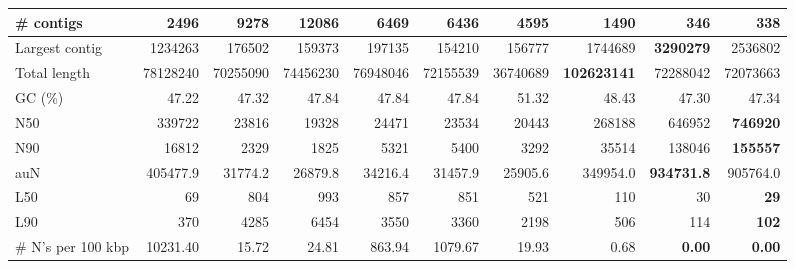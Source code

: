 \documentclass[12pt,a4paper]{article}
\begin{document}
\begin{table}[ht]
\begin{center}
\begin{tabular}{|l*{9}{|r}|}
\# contigs & 2496 & 9278 & 12086 & 6469 & 6436 & 4595 & 1490 & 346 & 338 \\ \hline
Largest contig & 1234263 & 176502 & 159373 & 197135 & 154210 & 156777 & 1744689 & {\bf 3290279} & 2536802 \\ \hline
Total length & 78128240 & 70255090 & 74456230 & 76948046 & 72155539 & 36740689 & {\bf 102623141} & 72288042 & 72073663 \\ \hline
GC (\%) & 47.22 & 47.32 & 47.84 & 47.84 & 47.84 & 51.32 & 48.43 & 47.30 & 47.34 \\ \hline
N50 & 339722 & 23816 & 19328 & 24471 & 23534 & 20443 & 268188 & 646952 & {\bf 746920} \\ \hline
N90 & 16812 & 2329 & 1825 & 5321 & 5400 & 3292 & 35514 & 138046 & {\bf 155557} \\ \hline
auN & 405477.9 & 31774.2 & 26879.8 & 34216.4 & 31457.9 & 25905.6 & 349954.0 & {\bf 934731.8} & 905764.0 \\ \hline
L50 & 69 & 804 & 993 & 857 & 851 & 521 & 110 & 30 & {\bf 29} \\ \hline
L90 & 370 & 4285 & 6454 & 3550 & 3360 & 2198 & 506 & 114 & {\bf 102} \\ \hline
\# N's per 100 kbp & 10231.40 & 15.72 & 24.81 & 863.94 & 1079.67 & 19.93 & 0.68 & {\bf 0.00} & {\bf 0.00} \\ \hline
\end{tabular}
\end{center}
\end{table}
\end{document}
